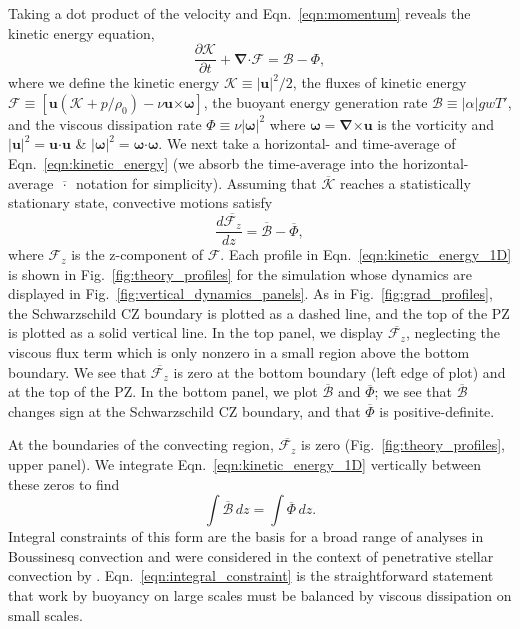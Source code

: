 \documentclass[twocolumn, linenumbers]{aastex631}
\renewcommand{\vec}[1]{\boldsymbol{#1}}
\renewcommand{\dot}{\vec{\cdot}}
\renewcommand{\bar}[1]{\overline{#1}}
\newcommand{\grad}{\vec{\nabla}}
\newcommand{\cross}{\vec{\times}}
\newcommand{\editone}[1]{#1}
\begin{document}
Taking a dot product of the velocity and Eqn.~\ref{eqn:momentum} reveals the kinetic energy equation,
\begin{equation}
\frac{\partial \mathcal{K}}{\partial t}
    + \grad\dot\editone{\vec{\mathcal{F}}}
= \mathcal{B} - \Phi,
\label{eqn:kinetic_energy}
\end{equation}
where we define the kinetic energy $\mathcal{K} \equiv |\vec{u}|^2/2$, the fluxes of kinetic energy $\editone{\vec{\mathcal{F}}} \equiv \left[\vec{u}(\mathcal{K} + p/\rho_0) - \nu\vec{u}\cross\vec{\omega} \right]$, the buoyant energy generation rate $\mathcal{B} \equiv |\alpha| g w T'$, and the viscous dissipation rate $\Phi \equiv \nu |\vec{\omega}|^2$ where $\vec{\omega} = \grad\cross\vec{u}$ is the vorticity and $|\vec{u}|^2 = \vec{u}\dot\vec{u}$ \& $|\vec{\omega}|^2 = \vec{\omega}\dot\vec{\omega}$.
We next take a horizontal- and time-average of Eqn.~\ref{eqn:kinetic_energy} (we absorb the time-average into the horizontal-average $\bar{\,\cdot\,}$ notation for simplicity).
Assuming that $\bar{\mathcal{K}}$ reaches a statistically stationary state, convective motions satisfy
\begin{equation}
    \frac{d\bar{\mathcal{F}_{\editone{z}}}}{dz} = \bar{\mathcal{B}} - \bar{\Phi},
\label{eqn:kinetic_energy_1D}
\end{equation}
\editone{where $\mathcal{F}_z$ is the z-component of $\vec{\mathcal{F}}$.}
Each profile in Eqn.~\ref{eqn:kinetic_energy_1D} is shown in Fig.~\ref{fig:theory_profiles} for the simulation whose dynamics are displayed in Fig.~\ref{fig:vertical_dynamics_panels}.
As in Fig.~\ref{fig:grad_profiles}, the Schwarzschild CZ boundary is plotted as a dashed line, and the top of the PZ is plotted as a solid vertical line.
In the top panel, we display $\bar{\mathcal{F}_{\editone{z}}}$, neglecting the viscous flux term which is only nonzero in a small region above the bottom boundary.
We see that $\bar{\mathcal{F}_{\editone{z}}}$ is zero at the bottom boundary (left edge of plot) and at the top of the PZ.
In the bottom panel, we plot $\bar{\mathcal{B}}$ and $\bar{\Phi}$; we see that $\bar{\mathcal{B}}$ changes sign at the Schwarzschild CZ boundary, and that $\bar{\Phi}$ is positive-definite.

At the boundaries of the convecting region, $\bar{\mathcal{F}_{\editone{z}}}$ is zero (Fig.~\ref{fig:theory_profiles}, upper panel).
We integrate Eqn.~\ref{eqn:kinetic_energy_1D} vertically between these zeros to find
\begin{equation}
\int \bar{\mathcal{B}}\,dz = \int \bar{\Phi}\,dz.
\label{eqn:integral_constraint}
\end{equation}
Integral constraints of this form are the basis for a broad range of analyses in Boussinesq convection \citep[see e.g.,][]{ahlers_etal_2009, goluskin2016} and were considered in the context of penetrative stellar convection by \citet{roxburgh1989}.
Eqn.~\ref{eqn:integral_constraint} is the straightforward statement that work by buoyancy on large scales must be balanced by viscous dissipation on small scales.
\end{document}
